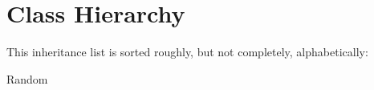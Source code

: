 \section{Class Hierarchy}
This inheritance list is sorted roughly, but not completely, alphabetically\+:\begin{DoxyCompactList}
\item {}
\item Random\begin{DoxyCompactList}
\item {}
\end{DoxyCompactList}
\item {}
\end{DoxyCompactList}
